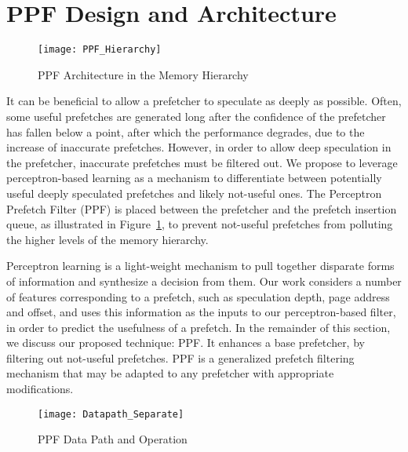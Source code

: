\section{PPF Design and Architecture}
\label{Arch}

\begin{figure}
  \begin{center}
  \texttt{[image: PPF\_Hierarchy]}
  \caption{PPF Architecture in the Memory Hierarchy}
  \label{fig:PPF_Hierarchy}
  \end{center}
\end{figure}

It can be beneficial to allow a prefetcher to speculate as deeply as
possible. Often, some useful prefetches are generated long after the
confidence of the prefetcher has fallen below a point, after which the
performance degrades, due to the increase of inaccurate prefetches. However,
in order to allow deep speculation in the prefetcher, inaccurate prefetches
must be filtered out. We propose to leverage perceptron-based learning as a
mechanism to differentiate between potentially useful deeply speculated
prefetches and likely not-useful ones. The Perceptron Prefetch Filter (PPF) is
placed between the prefetcher and the prefetch insertion queue, as illustrated
in Figure~\ref{fig:PPF_Hierarchy}, to prevent not-useful prefetches from
polluting the higher levels of the memory hierarchy.

Perceptron learning is a light-weight mechanism to pull together disparate
forms of information and synthesize a decision from them. Our work considers
a number of features corresponding to a prefetch, such as speculation depth,
page address and offset, and uses this information as the inputs to our
perceptron-based filter, in order to predict the usefulness of a prefetch. In
the remainder of this section, we discuss our proposed technique: PPF. It
enhances a base prefetcher, by filtering out not-useful prefetches. PPF is a
generalized prefetch filtering mechanism that may be adapted to any prefetcher
with appropriate modifications.

\begin{figure}[ht]
  \begin{center}
  \texttt{[image: Datapath\_Separate]}
  \caption{PPF Data Path and Operation}
  \label{fig:PPF_Datapath}
  \end{center}
\end{figure}

